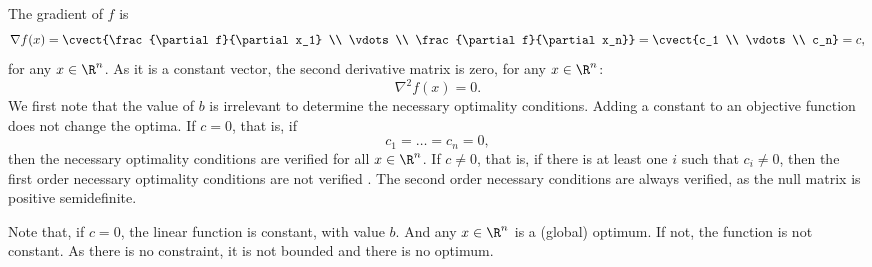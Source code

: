 
The gradient of $f$ is
\[
\nabla f(x) = \cvect{\frac{\partial f}{\partial x_1} \\ \vdots
  \\ \frac{\partial f}{\partial x_n}} = \cvect{c_1 \\ \vdots \\ c_n} = c,
\]
for any $x \in \R ^n$.
As it is a constant vector, the second derivative matrix is zero, for
any $x \in \R^n$:
\[
\nabla^2 f(x) = 0.
\]
We first note that the value of $b$ is irrelevant to determine the
necessary optimality conditions. Adding a constant to an objective
function does not change the optima. 
If $c=0$, that is, if
\[
c_1 = \ldots = c_n = 0,
\]
then the necessary optimality conditions are verified for all
$x\in\R^n$.
If $c \neq 0$, that is, if there is at least one $i$ such that $c_i
\neq 0$, then the first order necessary optimality conditions are not
verified . The second order necessary conditions are always verified,
as the null matrix is positive semidefinite.

Note that, if $c=0$, the linear function is constant, with value
$b$. And any $x\in \R^n$ is a (global) optimum. If not, the function
is not constant. As there is no constraint, it is not bounded and
there is no optimum.  


